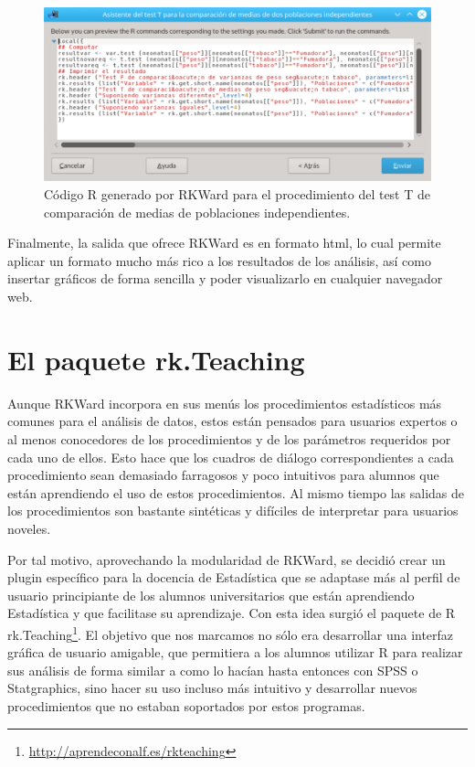 \documentclass[a4paper,10pt,twoside]{article}
\newcommand{\rkteaching}{\textsf{rk.Teaching}}
\newcommand{\rkward}{\textsf{RKWard}}
\newcommand{\spss}{\textsf{SPSS}}
\newcommand{\statgraphics}{\textsf{Statgraphics}}
\begin{document}
\begin{figure}[htbp!]
\centering
\includegraphics[width=\textwidth]{img/codigo_t_test.png}
\caption{Código R generado por \rkward{} para el procedimiento del test T de comparación de medias de poblaciones
independientes.}
\label{f:codigo-test-t}
\end{figure}

Finalmente, la salida que ofrece \rkward{} es en formato html, lo cual permite aplicar un formato mucho más rico a los
resultados de los análisis, así como insertar gráficos de forma sencilla y poder visualizarlo en cualquier navegador web.
 

\section{El paquete \rkteaching}
\label{s:rkteaching}
Aunque \rkward{} incorpora en sus menús los procedimientos estadísticos más comunes para el análisis de datos, estos
están pensados para usuarios expertos o al menos conocedores de los procedimientos y de los parámetros requeridos por
cada uno de ellos. 
Esto hace que los cuadros de diálogo correspondientes a cada procedimiento sean demasiado farragosos y poco intuitivos
para alumnos que están aprendiendo el uso de estos procedimientos.
Al mismo tiempo las salidas de los procedimientos son bastante sintéticas y difíciles de interpretar para usuarios
noveles. 

Por tal motivo, aprovechando la modularidad de \rkward, se decidió crear un plugin específico para la docencia de
Estadística que se adaptase más al perfil de usuario principiante de los alumnos universitarios que están aprendiendo
Estadística y que facilitase su aprendizaje. 
Con esta idea surgió el paquete de R \rkteaching\footnote{\url{http://aprendeconalf.es/rkteaching}}.
El objetivo que nos marcamos no sólo era desarrollar una interfaz gráfica de usuario amigable, que permitiera a los
alumnos utilizar R para realizar sus análisis de forma similar a como lo hacían hasta entonces con \spss{} o \statgraphics{},
sino hacer su uso incluso más intuitivo y desarrollar nuevos procedimientos que no estaban soportados por estos
programas. 
\end{document}
